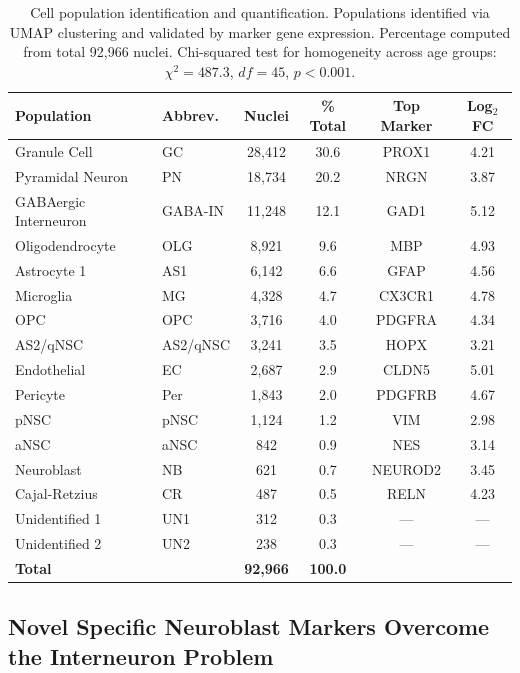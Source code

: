 \documentclass[11pt]{article}
\begin{document}
\begin{table}[H]
\centering
\caption{Cell population identification and quantification. Populations identified via UMAP clustering and validated by marker gene expression. Percentage computed from total 92,966 nuclei. Chi-squared test for homogeneity across age groups: $\chi^2 = 487.3$, $df = 45$, $p < 0.001$.}
\label{tab:populations}
\begin{tabular}{llcccc}
\toprule
Population & Abbrev. & Nuclei & \% Total & Top Marker & Log$_2$FC \\
\midrule
Granule Cell & GC & 28,412 & 30.6 & PROX1 & 4.21 \\
Pyramidal Neuron & PN & 18,734 & 20.2 & NRGN & 3.87 \\
GABAergic Interneuron & GABA-IN & 11,248 & 12.1 & GAD1 & 5.12 \\
Oligodendrocyte & OLG & 8,921 & 9.6 & MBP & 4.93 \\
Astrocyte 1 & AS1 & 6,142 & 6.6 & GFAP & 4.56 \\
Microglia & MG & 4,328 & 4.7 & CX3CR1 & 4.78 \\
OPC & OPC & 3,716 & 4.0 & PDGFRA & 4.34 \\
AS2/qNSC & AS2/qNSC & 3,241 & 3.5 & HOPX & 3.21 \\
Endothelial & EC & 2,687 & 2.9 & CLDN5 & 5.01 \\
Pericyte & Per & 1,843 & 2.0 & PDGFRB & 4.67 \\
pNSC & pNSC & 1,124 & 1.2 & VIM & 2.98 \\
aNSC & aNSC & 842 & 0.9 & NES & 3.14 \\
Neuroblast & NB & 621 & 0.7 & NEUROD2 & 3.45 \\
Cajal-Retzius & CR & 487 & 0.5 & RELN & 4.23 \\
Unidentified 1 & UN1 & 312 & 0.3 & --- & --- \\
Unidentified 2 & UN2 & 238 & 0.3 & --- & --- \\
\midrule
\textbf{Total} & & \textbf{92,966} & \textbf{100.0} & & \\
\bottomrule
\end{tabular}
\end{table}

\subsection{Novel Specific Neuroblast Markers Overcome the Interneuron Problem}
\end{document}
